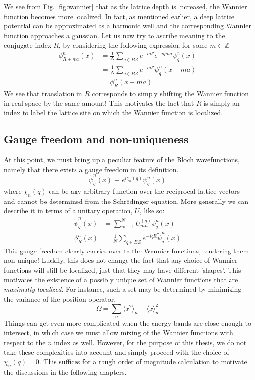 We see from Fig. \ref{fig:wannier} that as the lattice depth is increased, the Wannier function becomes more localized. In fact, as mentioned earlier, a deep lattice potential can be approximated as a harmonic well and the corresponding Wannier function approaches a gaussian. Let us now try to ascribe meaning to the conjugate index $R$, by considering the following expression for some $m \in \mathbb{Z}$.
\begin{align*}
    \phi_{R+ma}^n(x) &= \frac{1}{N}\sum_{q \in BZ} e^{-iqR} e^{-iqma} \psi_q^n(x)\\    
    &= \frac{1}{N}\sum_{q \in BZ} e^{-iqR} \psi_q^n(x - ma)\\
    &= \phi_{R}^n(x - ma)
\end{align*}
We see that translation in $R$ corresponds to simply shifting the Wannier function in real space by the same amount! This motivates the fact that $R$ is simply an index to label the lattice site on which the Wannier function is localized. 

\subsection{Gauge freedom and non-uniqueness}
At this point, we must bring up a peculiar feature of the Bloch wavefunctions, namely that there exists a gauge freedom in its definition.
\begin{equation}
    \tilde \psi_q^n(x) \equiv e^{i\chi_n(q)} \psi_q^n(x)
\end{equation}
where $\chi_n(q)$ can be any arbitrary function over the reciprocal lattice vectors and cannot be determined from the Schr\"{o}dinger equation. More generally we can describe it in terms of a unitary operation, $U$, like so:
\begin{align}
    \tilde \psi_q^n(x) &= \sum_{m =1}^N U_{mn}^{(q)} \psi_q^n(x)\\
    \phi^n_R(x) &= \frac{1}{N}\sum_{q \in BZ} e^{-iqR} \tilde\psi_q^n(x)
\end{align}
This gauge freedom clearly carries over to the Wannier functions, rendering them non-unique! Luckily, this does not change the fact that any choice of Wannier functions will still be localized, just that they may have different 'shapes'. This motivates the existence of a possibly unique set of Wannier functions that are \textit{maximally localized}\cite{Pavarini2011TheLA}. For instance, such a set may be determined by minimizing the variance of the position operator.
\begin{equation}
    \Omega = \sum_n \langle x^2 \rangle_n  - \langle x \rangle^2_n
\end{equation}
Things can get even more complicated when the energy bands are close enough to intersect, in which case we must allow mixing of the Wannier functions with respect to the $n$ index as well\cite{Marzari_2012, Walters_2013}. However, for the purpose of this thesis, we do not take these complexities into account and simply proceed with the choice of $\chi_n(q) = 0$. This suffices for a rough order of magnitude calculation to motivate the discussions in the following chapters.
